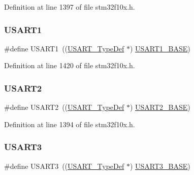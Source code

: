 Definition at line 1397 of file stm32f10x.\+h.

\mbox{\label{group___peripheral__declaration_ga92871691058ff7ccffd7635930cb08da}} 
\subsubsection{\texorpdfstring{U\+S\+A\+R\+T1}{USART1}}
{\footnotesize\ttfamily \#define U\+S\+A\+R\+T1~((\hyperlink{struct_u_s_a_r_t___type_def}{U\+S\+A\+R\+T\+\_\+\+Type\+Def} $\ast$) \hyperlink{group___peripheral__memory__map_ga86162ab3f740db9026c1320d46938b4d}{U\+S\+A\+R\+T1\+\_\+\+B\+A\+SE})}



Definition at line 1420 of file stm32f10x.\+h.

\mbox{\label{group___peripheral__declaration_gaf114a9eab03ca08a6fb720e511595930}} 
\subsubsection{\texorpdfstring{U\+S\+A\+R\+T2}{USART2}}
{\footnotesize\ttfamily \#define U\+S\+A\+R\+T2~((\hyperlink{struct_u_s_a_r_t___type_def}{U\+S\+A\+R\+T\+\_\+\+Type\+Def} $\ast$) \hyperlink{group___peripheral__memory__map_gade83162a04bca0b15b39018a8e8ec090}{U\+S\+A\+R\+T2\+\_\+\+B\+A\+SE})}



Definition at line 1394 of file stm32f10x.\+h.

\mbox{\label{group___peripheral__declaration_ga2350115553c1fe0a7bc14e6a7ec6a225}} 
\subsubsection{\texorpdfstring{U\+S\+A\+R\+T3}{USART3}}
{\footnotesize\ttfamily \#define U\+S\+A\+R\+T3~((\hyperlink{struct_u_s_a_r_t___type_def}{U\+S\+A\+R\+T\+\_\+\+Type\+Def} $\ast$) \hyperlink{group___peripheral__memory__map_gabe0d6539ac0026d598274ee7f45b0251}{U\+S\+A\+R\+T3\+\_\+\+B\+A\+SE})}




